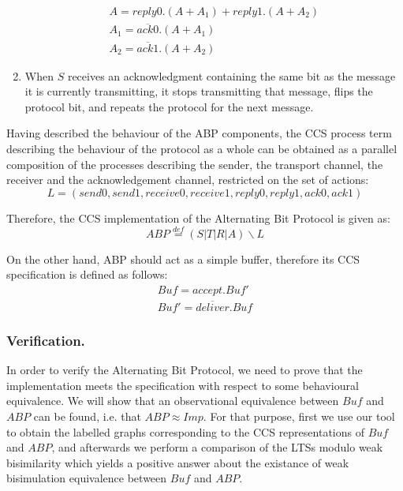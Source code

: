 \begin{enumerate}
        \begin{equation*}\label{trans_imp}
	      	\begin{array}{lcl}
						A=reply0.\left(A+A_{1}\right)+reply1.\left(A+A_{2}\right)\\
						A_{1}=\overline{ack0}.\left(A+A_{1}\right)\\
						A_{2}=\overline{ack1}.\left(A+A_{2}\right)
					\end{array}
				\end{equation*}
  \item When $S$ receives an acknowledgment containing the same bit as the message it is currently transmitting, it stops transmitting that message, flips the protocol bit, and repeats the protocol for the next message.\cite{Kulick}\cite{ProcessAlgebraParallel}
\end{enumerate}

Having described the behaviour of the ABP components, the CCS process term describing the behaviour of the protocol as a whole can be obtained as a parallel composition of the processes describing the sender, the transport channel, the receiver and the acknowledgement channel, restricted on the set of actions:
\begin{equation*}
  L = \left(send0,send1,receive0,receive1,reply0,reply1,ack0,ack1\right)
\end{equation*}

Therefore, the CCS implementation of the Alternating Bit Protocol is given as:
\begin{equation}\label{abp_imp}
	ABP \stackrel{def}{=}\left(S|T|R|A\right)\backslash L
\end{equation}

On the other hand, ABP should act as a simple buffer, therefore its CCS specification is defined as follows:
\begin{equation}\label{eq:abp_spec}
	\begin{array}{lcl}
		Buf = accept.Buf'\\
		Buf' = \overline{deliver}.Buf
	\end{array}
\end{equation}

\subsubsection{Verification.} In order to verify the Alternating Bit Protocol, we need to prove that the implementation meets the specification with respect to some behavioural equivalence. We will show that an observational equivalence between $Buf$ and $ABP$ can be found, i.e. that $ABP\approx Imp$. For that purpose, first we use our tool to obtain the labelled graphs corresponding to the CCS representations of $Buf$ and $ABP$, and afterwards we perform a comparison of the LTSs modulo weak bisimilarity which yields a positive answer about the existance of weak bisimulation equivalence between $Buf$ and $ABP$.

